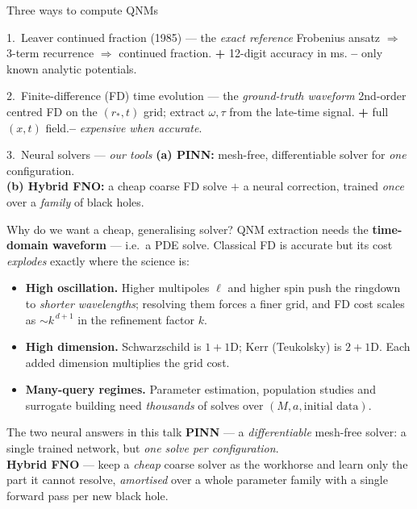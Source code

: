 \documentclass[aspectratio=169, 11pt]{beamer}
\newcommand{\bh}{black hole}
\newcommand{\pinn}{PINN}
\newcommand{\qnm}{QNM}
\newcommand{\qnms}{QNMs}
\newcommand{\fd}{FD}
\newcommand{\fno}{FNO}
\begin{document}
\begin{frame}{Three ways to compute \qnms{}}
  \footnotesize
  \begin{block}{1.\ Leaver continued fraction (1985) --- the \emph{exact reference}}
    Frobenius ansatz $\Rightarrow$ 3-term recurrence $\Rightarrow$ continued fraction.\;
    \textbf{+} 12-digit accuracy in ms.\quad
    \textbf{--} only known analytic potentials.
  \end{block}
  \begin{block}{2.\ Finite-difference (\fd{}) time evolution --- the \emph{ground-truth waveform}}
    2nd-order centred FD on the $(r_{\!*}, t)$ grid; extract $\omega,\tau$ from the
    late-time signal.\; \textbf{+} full $(x,t)$ field.\quad \textbf{--} \emph{expensive when accurate}.
  \end{block}
  \begin{block}{3.\ Neural solvers --- \emph{our tools}}
    \textbf{(a) \pinn{}:} mesh-free, differentiable solver for \emph{one} configuration.\\
    \textbf{(b) Hybrid \fno{}:} a cheap coarse FD solve $+$ a neural correction, trained
    \emph{once} over a \emph{family} of \bh{}s.
  \end{block}
\end{frame}

\begin{frame}{Why do we want a cheap, generalising solver?}
  \qnm{} extraction needs the \textbf{time-domain waveform} --- i.e.\ a PDE solve.
  Classical FD is accurate but its cost \emph{explodes} exactly where the science is:
  \medskip
  \begin{itemize}\small
    \item \textbf{High oscillation.} Higher multipoles $\ell$ and higher spin push the
          ringdown to \emph{shorter wavelengths}; resolving them forces a finer grid,
          and FD cost scales as $\sim\!k^{\,d+1}$ in the refinement factor $k$.
    \item \textbf{High dimension.} Schwarzschild is $1{+}1$D; Kerr (Teukolsky) is
          $2{+}1$D. Each added dimension multiplies the grid cost.
    \item \textbf{Many-query regimes.} Parameter estimation, population studies and
          surrogate building need \emph{thousands} of solves over $(M, a, \text{initial data})$.
  \end{itemize}
  \medskip
  \begin{block}{\footnotesize The two neural answers in this talk}
    \footnotesize
    \textbf{\pinn{}} --- a \emph{differentiable} mesh-free solver: a single trained
    network, but \emph{one solve per configuration}.\\[2pt]
    \textbf{Hybrid \fno{}} --- keep a \emph{cheap} coarse solver as the workhorse and
    learn only the part it cannot resolve, \emph{amortised} over a whole parameter
    family with a single forward pass per new \bh{}.
  \end{block}
\end{frame}
\end{document}
